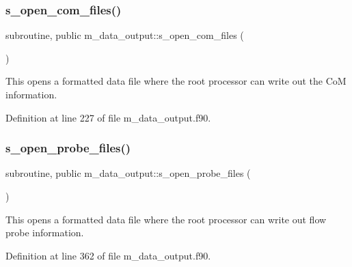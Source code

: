 \subsubsection{\texorpdfstring{s\+\_\+open\+\_\+com\+\_\+files()}{s\_open\_com\_files()}}
{\footnotesize\ttfamily subroutine, public m\+\_\+data\+\_\+output\+::s\+\_\+open\+\_\+com\+\_\+files (\begin{DoxyParamCaption}{ }\end{DoxyParamCaption})}



This opens a formatted data file where the root processor can write out the CoM information. 



Definition at line 227 of file m\+\_\+data\+\_\+output.\+f90.

\mbox{\label{namespacem__data__output_af469c3d867d96eb1ca255832e586ec97}} 
\subsubsection{\texorpdfstring{s\+\_\+open\+\_\+probe\+\_\+files()}{s\_open\_probe\_files()}}
{\footnotesize\ttfamily subroutine, public m\+\_\+data\+\_\+output\+::s\+\_\+open\+\_\+probe\+\_\+files (\begin{DoxyParamCaption}{ }\end{DoxyParamCaption})}



This opens a formatted data file where the root processor can write out flow probe information. 



Definition at line 362 of file m\+\_\+data\+\_\+output.\+f90.

\mbox{\label{namespacem__data__output_a050b4b01f11c1d352f55b46b6514634d}} 
